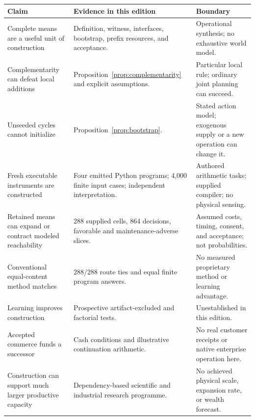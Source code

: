 \begin{longtable}{@{}P{1.53in}P{2.51in}P{2.43in}@{}}
\toprule
\textbf{Claim} & \textbf{Evidence in this edition} & \textbf{Boundary}\\
\midrule
\endhead
Complete means are a useful unit of construction & Definition, witness, interfaces, bootstrap, prefix resources, and acceptance. & Operational synthesis; no exhaustive world model.\\[.35em]
Complementarity can defeat local additions & Proposition~\ref{prop:complementarity} and explicit assumptions. & Particular local rule; ordinary joint planning can succeed.\\[.35em]
Unseeded cycles cannot initialize & Proposition~\ref{prop:bootstrap}. & Stated action model; exogenous supply or a new operation can change it.\\[.35em]
Fresh executable instruments are constructed & Four emitted Python programs; 4,000 finite input cases; independent interpretation. & Authored arithmetic tasks; supplied compiler; no physical sensing.\\[.35em]
Retained means can expand or contract modeled reachability & 288 supplied cells, 864 decisions, favorable and maintenance-adverse slices. & Assumed costs, timing, consent, and acceptance; not probabilities.\\[.35em]
Conventional equal-content method matches & 288/288 route ties and equal finite program answers. & No measured proprietary method or learning advantage.\\[.35em]
Learning improves construction & Prospective artifact-excluded and factorial tests. & Unestablished in this edition.\\[.35em]
Accepted commerce funds a successor & Cash conditions and illustrative continuation arithmetic. & No real customer receipts or native enterprise operation here.\\[.35em]
Construction can support much larger productive capacity & Dependency-based scientific and industrial research programme. & No achieved physical scale, expansion rate, or wealth forecast.\\
\bottomrule
\end{longtable}
